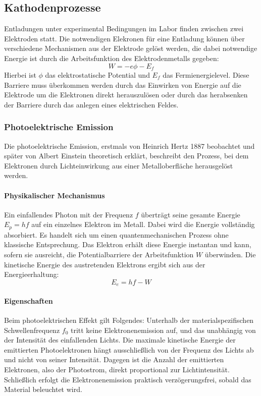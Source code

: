 \subsection{Kathodenprozesse}
Entladungen unter experimental Bedingungen im Labor finden zwischen zwei Elektroden statt. Die notwendigen Elekronen für eine Entladung können über verschiedene Mechanismen aus der Elektrode gelöst werden, die dabei notwendige Energie ist durch die Arbeitsfunktion des Elektrodenmetalls gegeben:
\begin{equation}
    W = -e \phi - E_f
\end{equation}
Hierbei ist \(\phi\) das elektrostatische Potential und \(E_f\) das Fermienergielevel. Diese Barriere muss überkommen werden durch das Einwirken von Energie auf die Elektrode um die Elektronen direkt herauszulösen oder durch das herabsenken der Barriere durch das anlegen eines elektrischen Feldes.
\subsubsection{Photoelektrische Emission}
Die photoelektrische Emission, erstmals von Heinrich Hertz 1887 beobachtet und später von Albert Einstein theoretisch erklärt, beschreibt den Prozess, bei dem Elektronen durch Lichteinwirkung aus einer Metalloberfläche herausgelöst werden.
\paragraph{Physikalischer Mechanismus}
Ein einfallendes Photon mit der Frequenz \(f\) überträgt seine gesamte Energie \(E_p = hf\) auf ein einzelnes Elektron im Metall. Dabei wird die Energie vollständig absorbiert. Es handelt sich um einen quantenmechanischen Prozess ohne klassische Entsprechung. Das Elektron erhält diese Energie instantan und kann, sofern sie ausreicht, die Potentialbarriere der Arbeitsfunktion \(W\) überwinden. Die kinetische Energie des austretenden Elektrons ergibt sich aus der Energieerhaltung: 
\begin{equation}
    E_e = hf - W
\end{equation}
\paragraph{Eigenschaften}
Beim photoelektrischen Effekt gilt Folgendes: Unterhalb der materialspezifischen Schwellenfrequenz \(f_0\) tritt keine Elektronenemission auf, und das unabhängig von der Intensität des einfallenden Lichts. Die maximale kinetische Energie der emittierten Photoelektronen hängt ausschließlich von der Frequenz des Lichts ab und nicht von seiner Intensität. Dagegen ist die Anzahl der emittierten Elektronen, also der Photostrom, direkt proportional zur Lichtintensität. Schließlich erfolgt die Elektronenemission praktisch verzögerungsfrei, sobald das Material beleuchtet wird. \cite{cooray2014}
